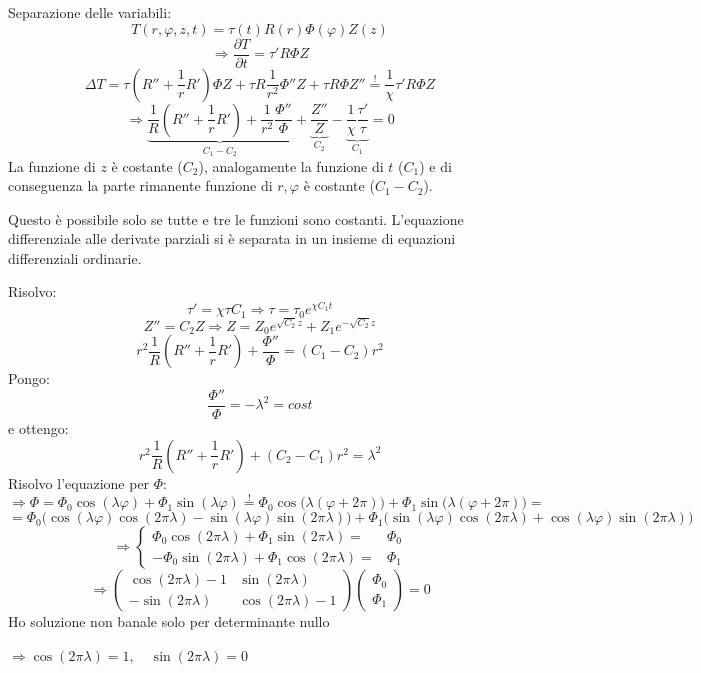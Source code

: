 \documentclass[a4paper,11pt]{report}
\begin{document}
Separazione delle variabili:
\[
T(r,\varphi,z,t)=\tau(t)R(r)\Phi(\varphi)Z(z)
\]
\[
\Rightarrow \frac{\partial T}{\partial t}=\tau'R\Phi Z
\]
\[
\Delta T=\tau(R'' +\frac{1}{r}R')\Phi Z + \tau R \frac{1}{r^2}\Phi''Z+\tau R \Phi Z'' \overset{!}{=} \frac{1}{\chi}\tau'R\Phi Z 
\]
\[
\Rightarrow \underbrace{ \frac{1}{R}(R'' + \frac{1}{r}R') + \frac{1}{r^2} \frac{\Phi''}{\Phi}}_{C_1-C_2}+\underbrace{\frac{Z''}{Z}}_{C_2}-\underbrace{\frac{1}{\chi}\frac{\tau'}{\tau}}_{C_1}=0
\]
La funzione di $z$ \`e costante ($C_2$), analogamente la funzione di $t$ ($C_1$) e di conseguenza la parte rimanente funzione di $r,\varphi$ \`e costante ($C_1-C_2$).

Questo \`e possibile solo se tutte e tre le funzioni sono costanti. L'equazione differenziale alle derivate parziali si \`e separata in un insieme di equazioni differenziali ordinarie.

Risolvo:
\[
\tau'=\chi\tau C_1 \Rightarrow \tau=\tau_0 e^{\chi C_1 t} 
\]
\[
Z''=C_2Z \Rightarrow Z=Z_0e^{\sqrt{C_2}z}+Z_1e^{-\sqrt{C_2}z}
\]
\[
r^2\frac{1}{R}(R''+\frac{1}{r}R')+\frac{\Phi''}{\Phi}=(C_1-C_2)r^2 
\]
Pongo:
\[
\frac{\Phi''}{\Phi}=-\lambda^2=cost
\]
e ottengo:
\[
r^2\frac{1}{R}(R''+\frac{1}{r}R')+ (C_2-C_1)r^2=\lambda^2
\]
Risolvo l'equazione per $\Phi$:
\[
\Rightarrow \Phi=\Phi_0 \cos{(\lambda\varphi)} + \Phi_1\sin{(\lambda\varphi)}\overset{!}{=}
\Phi_0\cos{\big(\lambda(\varphi+2\pi)\big)}+\Phi_1\sin{\big(\lambda(\varphi+2\pi)\big)}=
\]
\[
=\Phi_0\big( \cos{(\lambda\varphi)} \cos{( 2\pi\lambda)} - \sin{(\lambda\varphi)} \sin{( 2\pi\lambda)} \big)+
\Phi_1\big( \sin{(\lambda\varphi)} \cos{( 2\pi\lambda)} + \cos{(\lambda\varphi)} \sin{( 2\pi\lambda)} \big)
\]
\[
\Rightarrow \left\{\begin{aligned}
\Phi_0\cos{(2\pi\lambda)} + \Phi_1 \sin{(2\pi\lambda)}=&\Phi_0\\
-\Phi_0\sin{(2\pi\lambda)} + \Phi_1 \cos{(2\pi\lambda)}=&\Phi_1
\end{aligned}\right.
\]
\[
\Rightarrow
\left(\begin{matrix}
\cos( 2\pi\lambda) -1 & \sin( 2\pi\lambda) \\
-\sin( 2\pi\lambda) & \cos( 2\pi\lambda) -1
\end{matrix}\right)
\left(\begin{matrix}
\Phi_0\\
\Phi_1
\end{matrix}\right)
=0
\]
Ho soluzione non banale solo per determinante nullo

$\Rightarrow \cos (2\pi\lambda)=1, \quad \sin (2\pi\lambda)=0$  
\end{document}
